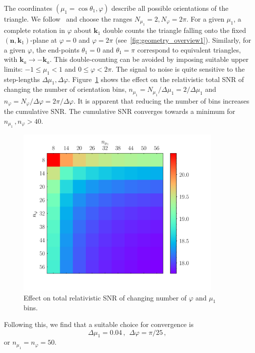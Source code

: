 The coordinates $(\mu_1=\cos\theta_{1},\varphi)$ describe all possible orientations of the triangle. 
We follow~\cite{Karagiannis:2018jdt} and choose the ranges $N_{\mu_1}=2, N_{\varphi}=2\pi$.
For a given $\mu_{1}$, a complete rotation in $\varphi$ about $\bm{k}_1$ double counts the  triangle falling onto the fixed $(\bm{n},\bm{k}_1)$-plane at $\varphi=0$ and $\varphi=2\pi$ (see~\ref{fig:geometry_overview1}). Similarly, for a given $\varphi$,  the end-points $\theta_1=0$ and $\theta_1=\pi$  correspond to equivalent triangles, with $\bm{k}_a \to - \bm{k}_a$.
This double-counting can be avoided by imposing suitable upper limits:
$-1\leq \mu_1 <1$ and $0\leq \varphi < 2\pi$.
The signal to noise is quite sensitive to the step-lengths $\Delta \mu_{1}, \Delta\varphi$. Figure~\ref{fig4x} shows the effect on the relativistic total SNR of changing the number of orientation bins, $n_{\mu_1}=N_{\mu_1}/\Delta{\mu_1}=2 /\Delta{\mu_1}$  and $n_\varphi=N_\varphi/\Delta\varphi =2\pi/\Delta\varphi$. It is apparent that reducing the number of bins increases the cumulative SNR. The cumulative SNR converges towards a minimum for $n_{\mu_{1}}\,, n_{\varphi} > 40$.
\begin{figure}[!ht]
\centering
\includegraphics[width=0.9\textwidth]{fig/colournmu1nphi_Doppler-eps-converted-to} 
\caption{Effect on 
total relativistic SNR of changing number of  $\varphi$ and $\mu_1$ bins. 
} \label{fig4x}
\end{figure} 
%
Following this, we find that a suitable choice for convergence is
\begin{equation}\label{ori}
\Delta \mu_{1}=0.04\,,~~ \Delta\varphi= \pi/25 \,,
\end{equation}
or $n_{\mu_{1}}= n_{\varphi}=50$.

